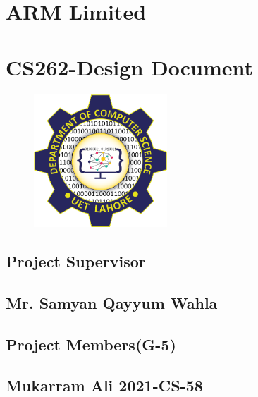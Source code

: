 \documentclass[12pt]{article}
\begin{document}
 \begin{center}
	    \section*{ARM Limited} 
	    \section*{CS262-Design Document} \hfill
	    \begin{figure}[!ht]
	            \begin{center}
	                \includegraphics[width=50mm]{logo.png}
	            \end{center}
        \end{figure}  
        \begin{center}
        \section*{Project Supervisor}
            \subsection*{Mr. Samyan Qayyum Wahla}
            \subsection* {}
            \subsection* {}
        \end{center}
        \begin{center}
	    \section*{Project Members(G-5) }
	        \subsection*{Mukarram Ali       2021-CS-58}

\end{center}
\end{center}
\end{document}
